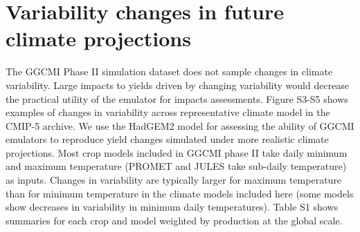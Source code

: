 \documentclass[12pt]{article}
\begin{document}
\clearpage
\section{Variability changes in future climate projections}
\begin{flushleft}
The GGCMI Phase II simulation dataset does not sample changes in climate variability. Large impacts to yields driven by changing variability would decrease the practical utility of the emulator for impacts assessments.
Figure S3-S5 shows examples of changes in variability across representative climate model in the CMIP-5 archive. 
We use the HadGEM2 model for assessing the ability of GGCMI emulators to reproduce yield changes simulated under more realistic climate projections.
Most crop models included in GGCMI phase II take daily minimum and maximum temperature (PROMET and JULES take sub-daily temperature) as inputs. 
Changes in variability are typically larger for maximum temperature than for minimum temperature in the climate models included here (some models show decreases in variability in minimum daily temperatures).
Table S1 shows summaries for each crop and model weighted by production at the global scale. 
\end{flushleft}

\end{document}
